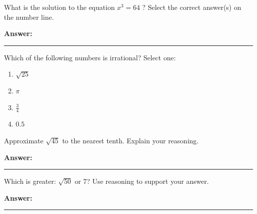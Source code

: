 \documentclass[12pt]{article}
\begin{document}
\begin{tcolorbox}[colframe=black!50, colback=white, title=\textbf{Problem 3 (8.EE.A.2)}]
What is the solution to the equation \(x^3 = 64\) ? Select the correct answer(s) on the number line. 

\vspace{1cm}


\vspace{1cm}
\textbf{Answer:} \rule{0.5\textwidth}{0.4mm}
\end{tcolorbox}

\begin{tcolorbox}[colframe=black!50, colback=white, title=\textbf{Problem 4 (8.NS.A.1)}]
Which of the following numbers is irrational? Select one:

\begin{enumerate}[label=(\Alph*)]
    \item \( \sqrt{25} \)
    \item \( \pi \)
    \item \( \frac{3}{4} \)
    \item \( 0.5 \)
\end{enumerate}
\end{tcolorbox}

\begin{tcolorbox}[colframe=black!50, colback=white, title=\textbf{Problem 5 (8.NS.A.2)}]
Approximate \(\sqrt{45}\) to the nearest tenth. Explain your reasoning.

\vspace{3cm}
\textbf{Answer:} \rule{0.5\textwidth}{0.4mm}
\end{tcolorbox}

\begin{tcolorbox}[colframe=black!50, colback=white, title=\textbf{Problem 6 (8.NS.A.2)}]
Which is greater: \( \sqrt{50} \) or \( 7 \)? Use reasoning to support your answer.

\vspace{3cm}
\textbf{Answer:} \rule{0.5\textwidth}{0.4mm}
\end{tcolorbox}
\end{document}
